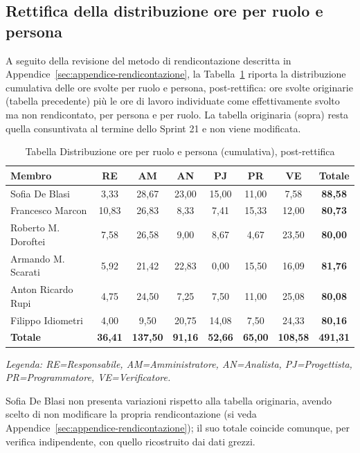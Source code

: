 \subsection{Rettifica della distribuzione ore per ruolo e persona}
\label{sec:organigramma-rettifica}

A seguito della revisione del metodo di rendicontazione descritta in
Appendice~\ref{sec:appendice-rendicontazione}, la Tabella~\ref{tab:organigramma-rettifica}
riporta la distribuzione cumulativa delle ore svolte per ruolo e persona,
post-rettifica: ore svolte originarie (tabella precedente) più le ore di
lavoro individuate come effettivamente svolto ma non rendicontato,
per persona e per ruolo. La tabella originaria (sopra) resta quella
consuntivata al termine dello Sprint 21 e non viene modificata.

\begin{table}[H]
    \centering
    \renewcommand{\arraystretch}{1.3}
    \begin{tabularx}{\textwidth}{|X|c|c|c|c|c|c|c|}
        \hline
        \textbf{Membro} & \textbf{RE} & \textbf{AM} & \textbf{AN} &
        \textbf{PJ} & \textbf{PR} & \textbf{VE} & \textbf{Totale} \\
        \hline
        Sofia De Blasi       & 3,33  & 28,67 & 23,00 & 15,00 & 11,00 & 7,58  & \textbf{88,58} \\
        \hline
        Francesco Marcon     & 10,83 & 26,83 & 8,33  & 7,41  & 15,33 & 12,00 & \textbf{80,73} \\
        \hline
        Roberto M. Doroftei  & 7,58  & 26,58 & 9,00  & 8,67  & 4,67  & 23,50 & \textbf{80,00} \\
        \hline
        Armando M. Scarati   & 5,92  & 21,42 & 22,83 & 0,00  & 15,50 & 16,09 & \textbf{81,76} \\
        \hline
        Anton Ricardo Rupi   & 4,75  & 24,50 & 7,25  & 7,50  & 11,00 & 25,08 & \textbf{80,08} \\
        \hline
        Filippo Idiometri    & 4,00  & 9,50  & 20,75 & 14,08 & 7,50  & 24,33 & \textbf{80,16} \\
        \hline
        \textbf{Totale}      & \textbf{36,41} & \textbf{137,50} & \textbf{91,16} & \textbf{52,66} & \textbf{65,00} & \textbf{108,58} & \textbf{491,31} \\
        \hline
    \end{tabularx}
    \begin{minipage}{\textwidth}
        \smallskip
        \footnotesize\textit{Legenda: RE=Responsabile, AM=Amministratore,
        AN=Analista, PJ=Progettista, PR=Programmatore, VE=Verificatore.}
    \end{minipage}
    \caption{Tabella Distribuzione ore per ruolo e persona (cumulativa), post-rettifica}
    \label{tab:organigramma-rettifica}
\end{table}

Sofia De Blasi non presenta variazioni rispetto alla tabella originaria,
avendo scelto di non modificare la propria rendicontazione (si veda
Appendice~\ref{sec:appendice-rendicontazione}); il suo totale coincide
comunque, per verifica indipendente, con quello ricostruito dai dati
grezzi.